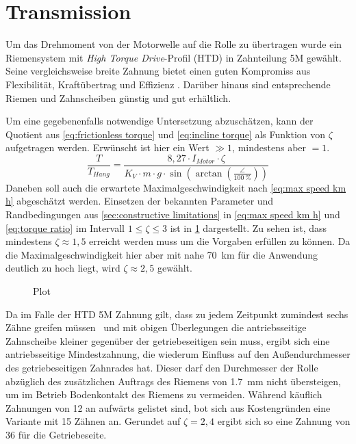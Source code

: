 	\section{Transmission}\label{sec:transmission}
		Um das Drehmoment von der Motorwelle auf die Rolle zu übertragen wurde ein Riemensystem mit \textit{High Torque Drive}-Profil (HTD) in Zahnteilung 5M gewählt. 
		Seine vergleichsweise breite Zahnung bietet einen guten Kompromiss aus Flexibilität, Kraftübertrag und Effizienz \cite{gates.catalogue.2021}.
		Darüber hinaus sind entsprechende Riemen und Zahnscheiben günstig und gut erhältlich.\par\medskip
		Um eine gegebenenfalls notwendige Untersetzung abzuschätzen, kann der Quotient aus \cref{eq:frictionless torque} und \cref{eq:incline torque} als Funktion von \(\zeta\) aufgetragen werden.
		Erwünscht ist hier ein Wert \(\gg 1\), mindestens aber \(= 1\).
		\begin{equation}
			\frac{T}{T_{Hang}} = \frac{8,27 \cdot I_{Motor} \cdot \zeta}{K_V \cdot m \cdot g \cdot \sin\left(\arctan\left(\frac{\angle}{\qty{100}{\percent}}\right)\right)}
			\label{eq:torque ratio}
		\end{equation}
		Daneben soll auch die erwartete Maximalgeschwindigkeit nach \cref{eq:max speed km h} abgeschätzt werden.
		Einsetzen der bekannten Parameter und Randbedingungen aus \cref{sec:constructive limitations} in \cref{eq:max speed km h} und \cref{eq:torque ratio} im Intervall \(1 \leq \zeta \leq 3\) ist in \cref{fig:torque ratio and vmax vs zetas} dargestellt.
		Zu sehen ist, dass mindestens \(\zeta \approx 1,5\) erreicht werden muss um die Vorgaben erfüllen zu können.
		Da die Maximalgeschwindigkeit hier aber mit nahe \qty{70}{\kilo\metre} für die Anwendung deutlich zu hoch liegt, wird \(\zeta \approx 2,5\) gewählt.
		\begin{figure}[h]
			\centering
			
			\caption{Plot}
			\label{fig:torque ratio and vmax vs zetas}
		\end{figure}
		
		Da im Falle der HTD 5M Zahnung gilt, dass zu jedem Zeitpunkt zumindest sechs Zähne greifen müssen~\cite{MAEDLERGmbH.2021} und mit obigen Überlegungen die antriebsseitige Zahnscheibe kleiner gegenüber der getriebeseitigen sein muss, ergibt sich eine antriebsseitige Mindestzahnung, die wiederum Einfluss auf den Außendurchmesser des getriebeseitigen Zahnrades hat.
		Dieser darf den Durchmesser der Rolle abzüglich des zusätzlichen Auftrags des Riemens von \qty{1,7}{\milli\metre}\cite{gates.catalogue.2021} nicht übersteigen, um im Betrieb Bodenkontakt des Riemens zu vermeiden.
		Während käuflich Zahnungen von 12 an aufwärts gelistet sind, bot sich aus Kostengründen eine Variante mit 15 Zähnen an.
		Gerundet auf \(\zeta=2,4\) ergibt sich so eine Zahnung von 36 für die Getriebeseite.
		
